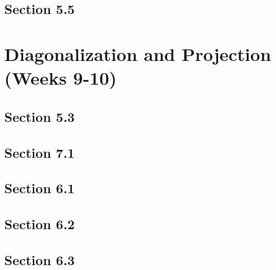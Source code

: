 \documentclass{amsart}
\begin{document}
\subsection*{Section 5.5}


\section{Diagonalization and Projection (Weeks 9-10)}

\subsection*{Section 5.3}
\subsection*{Section 7.1}
\subsection*{Section 6.1}
\subsection*{Section 6.2}
\subsection*{Section 6.3}
\end{document}
